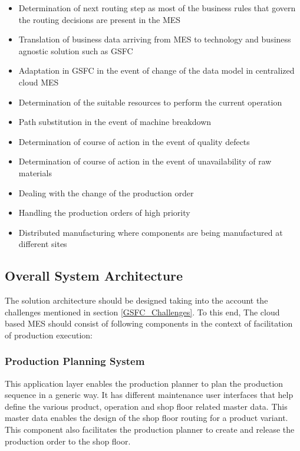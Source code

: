 \documentclass[10pt,conference,compsocconf]{IEEEtran}
\begin{document}
 \begin{itemize}
\item Determination of next routing step as most of the business rules that govern the routing decisions are present in the MES
\item Translation of business data arriving from MES to technology and business agnostic solution such as GSFC
\item Adaptation in GSFC in the event of change of the data model in centralized cloud MES
\item Determination of the suitable resources to perform the current operation
\item Path substitution in the event of machine breakdown \cite{Leitao:2009:Agent-Based}
\item Determination of course of action in the event of quality defects
\item Determination of course of action in the event of unavailability of raw materials
\item Dealing with the change of the production order \cite{Leitao:2009:Agent-Based}
\item Handling the production orders of high priority \cite{Leitao:2009:Agent-Based}
\item Distributed manufacturing where components are being manufactured at different sites
\end{itemize}
\subsection{Overall System Architecture}
The solution architecture should be designed taking into the account the challenges mentioned in section \ref{GSFC_Challenges}. To this end, The cloud based MES should consist of following components in the context of facilitation of production execution:
\subsubsection{Production Planning System}
This application layer enables the production planner to plan the production sequence in a generic way. It has different maintenance user interfaces that help define the various product, operation and shop floor related master data. This master data enables the design of the shop floor routing for a product variant. This component also facilitates the production planner to create and release the production order to the shop floor.
\end{document}
